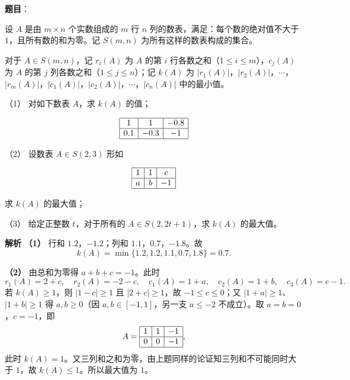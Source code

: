 \begin{answer}

\textbf{题目}：

设 $A$ 是由 $m\times n$ 个实数组成的 $m$ 行 $n$ 列的数表，满足：每个数的绝对值不大于 $1$，且所有数的和为零。记 $S(m,n)$ 为所有这样的数表构成的集合。

对于 $A\in S(m,n)$，记 $r_i(A)$ 为 $A$ 的第 $i$ 行各数之和（$1\leqslant i\leqslant m$），$c_j(A)$ 为 $A$ 的第 $j$ 列各数之和（$1\leqslant j\leqslant n$）；记 $k(A)$ 为 $|r_1(A)|$，$|r_2(A)|$，$\cdots$，$|r_m(A)|$，$|c_1(A)|$，$|c_2(A)|$，$\cdots$，$|c_n(A)|$ 中的最小值。

（1） 对如下数表 $A$，求 $k(A)$ 的值；

\nopagebreak[4]
\[\begin{array}{|c|c|c|}\hline 1 & 1 & -0.8\\ \hline 0.1 & -0.3 & -1\\ \hline\end{array}\]

（2） 设数表 $A\in S(2,3)$ 形如

\nopagebreak[4]
\[\begin{array}{|c|c|c|}\hline 1 & 1 & c\\ \hline a & b & -1\\ \hline\end{array}\]

求 $k(A)$ 的最大值；

（3） 给定正整数 $t$，对于所有的 $A\in S(2,2t+1)$，求 $k(A)$ 的最大值。

\textbf{解析}
\textbf{（1）} 行和 $1.2$，$-1.2$；列和 $1.1$，$0.7$，$-1.8$。故
\nopagebreak[4]
\[k(A)=\min\{1.2,1.2,1.1,0.7,1.8\}=0.7.\]

\textbf{（2）} 由总和为零得 $a+b+c=-1$。此时
\nopagebreak[4]
\[r_1(A)=2+c,\quad r_2(A)=-2-c,\quad c_1(A)=1+a,\quad c_2(A)=1+b,\quad c_3(A)=c-1.\]
若 $k(A)\geqslant1$，则 $|1-c|\geqslant1$ 且 $|2+c|\geqslant1$，故 $-1\leqslant c\leqslant0$；又 $|1+a|\geqslant1$、$|1+b|\geqslant1$ 得 $a,b\geqslant0$（因 $a,b\in[-1,1]$，另一支 $a\leqslant-2$ 不成立）。取 $a=b=0$，$c=-1$，即
\nopagebreak[4]
\[A=\begin{array}{|c|c|c|}\hline 1&1&-1\\ \hline 0&0&-1\\ \hline\end{array},\]
此时 $k(A)=1$。又三列和之和为零，由上题同样的论证知三列和不可能同时大于 $1$，故 $k(A)\leqslant1$。所以最大值为 $1$。


\end{answer}
